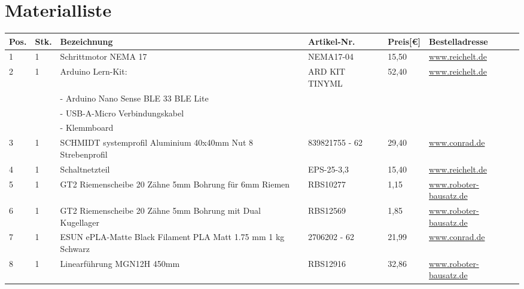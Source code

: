 \documentclass[12pt,a4paper]{scrbook}
\begin{document}
\cleardoublepage
{}




\chapter{Materialliste}
\begin{center}
	\fontsize{8}{10}\selectfont
	\begin{tabularx}{\textwidth}{|p{0.4cm}|p{0.4cm}|X|X|p{1cm}|X|}
		\hline 
		\textbf{Pos.} & \textbf{Stk.} & \textbf{Bezeichnung} & \textbf{Artikel-Nr.} & \textbf{Preis[€]} & \textbf{Bestelladresse} \\ \hline
		1 & 1 & Schrittmotor NEMA 17 & NEMA17-04 & 15,50 & \href{https://www.reichelt.de}{www.reichelt.de} \\
		\hline
		2 & 1 & Arduino Lern-Kit: & ARD KIT TINYML & 52,40 & \href{https://www.reichelt.de}{www.reichelt.de} \\
		&   & - Arduino Nano Sense BLE 33 BLE Lite & & & \\ 
		&   &- USB-A-Micro Verbindungskabel & & & \\
		&   &- Klemmboard & & & \\
		\hline
		3 & 1 & SCHMIDT systemprofil Aluminium 40x40mm Nut 8 Strebenprofil & 839821755 - 62 & 29,40 & \href{https://www.conrad.de/}{www.conrad.de} \\ 
		\hline
		4 & 1 & Schaltnetzteil & EPS-25-3,3 & 15,40 & \href{https://www.reichelt.de}{www.reichelt.de} \\ 
		\hline
		5 & 1 & GT2 Riemenscheibe 20 Zähne 5mm Bohrung für 6mm Riemen & RBS10277 & 1,15 & \href{https://www.roboter-bausatz.de/}{www.roboter-bausatz.de} \\ 
		\hline
		6 & 1 & GT2 Riemenscheibe 20 Zähne 5mm Bohrung mit Dual Kugellager & RBS12569 & 1,85 &	\href{https://www.roboter-bausatz.de/}{www.roboter-bausatz.de} \\ 
		\hline
		7 & 1 & ESUN ePLA-Matte Black Filament PLA Matt 1.75 mm 1 kg Schwarz  & 2706202 - 62 & 21,99 & \href{https://www.conrad.de/}{www.conrad.de} \\ 
		\hline
		8 & 1 & Linearführung MGN12H 450mm & RBS12916 & 32,86 & \href{https://www.roboter-bausatz.de}{www.roboter-bausatz.de} \\

\end{tabularx}
\end{center}
\end{document}
